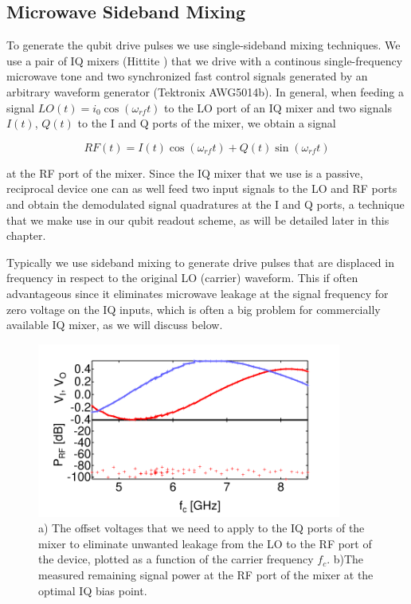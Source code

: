 \subsection{Microwave Sideband Mixing}

To generate the qubit drive pulses we use single-sideband mixing techniques. We use a pair of IQ mixers (Hittite ) that we drive with a continous single-frequency microwave tone and two synchronized fast control signals generated by an arbitrary waveform generator (Tektronix AWG5014b). In general, when feeding a signal $LO(t) = i_0 \cos{(\omega_{rf} t )}$ to the LO port of an IQ mixer and two signals $I(t)$, $Q(t)$ to the I and Q ports of the mixer, we obtain a signal

\begin{equation}
RF(t) = I(t)\cos{(\omega_{rf} t)}+Q(t)\sin{(\omega_{rf} t)} \label{eq:iqMixer}
\end{equation}

at the RF port of the mixer. Since the IQ mixer that we use is a passive, reciprocal device one can as well feed two input signals to the LO and RF ports and obtain the demodulated signal quadratures at the I and Q ports, a technique that we make use in our qubit readout scheme, as will be detailed later in this chapter.

Typically we use sideband mixing to generate drive pulses that are displaced in frequency in respect to the original LO (carrier) waveform. This if often advantageous since it eliminates microwave leakage at the signal frequency for zero voltage on the IQ inputs, which is often a big problem for commercially available IQ mixer, as we will discuss below.

\begin{figure}
	\centering
	\includegraphics[width=10cm]{"./data/ct5/iq mixers/iq_offsets"}
	\caption[...]{a) The offset voltages that we need to apply to the IQ ports of the mixer to eliminate unwanted leakage from the LO to the RF port of the device, plotted as a function of the carrier frequency $f_{c}$. b)The measured remaining signal power at the RF port of the mixer at the optimal IQ bias point.}
	\label{fig:iq_mixer_offset}
\end{figure}

